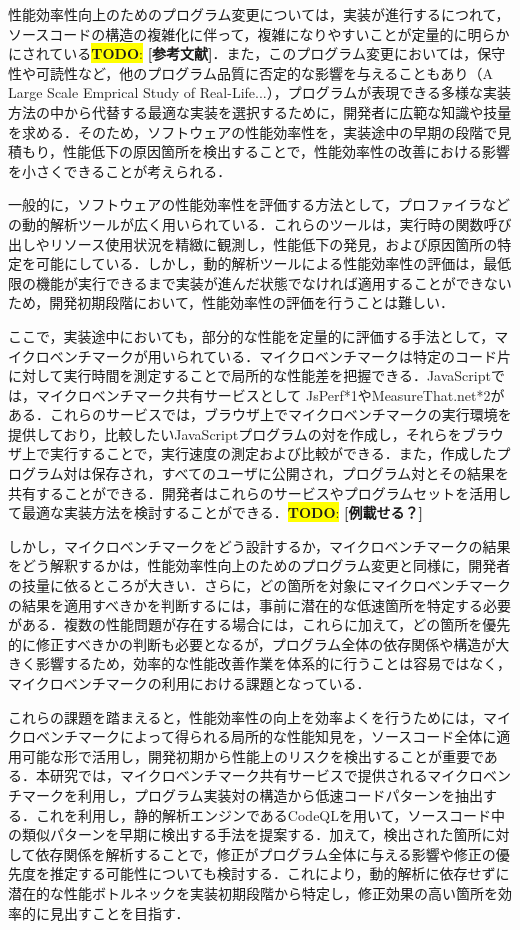 \documentclass[submit,techrep,noauthor]{ipsj}
\newcommand{\todo}[1]{\colorbox{yellow}{{\bf TODO}:}{\color{red} {\textbf{[#1]}}}}
\begin{document}
性能効率性向上のためのプログラム変更については，実装が進行するにつれて，ソースコードの構造の複雑化に伴って，複雑になりやすいことが定量的に明らかにされている\todo{参考文献}．また，このプログラム変更においては，保守性や可読性など，他のプログラム品質に否定的な影響を与えることもあり（A Large Scale Emprical Study of Real-Life...），プログラムが表現できる多様な実装方法の中から代替する最適な実装を選択するために，開発者に広範な知識や技量を求める．そのため，ソフトウェアの性能効率性を，実装途中の早期の段階で見積もり，性能低下の原因箇所を検出することで，性能効率性の改善における影響を小さくできることが考えられる． 

一般的に，ソフトウェアの性能効率性を評価する方法として，プロファイラなどの動的解析ツールが広く用いられている．これらのツールは，実行時の関数呼び出しやリソース使用状況を精緻に観測し，性能低下の発見，および原因箇所の特定を可能にしている．しかし，動的解析ツールによる性能効率性の評価は，最低限の機能が実行できるまで実装が進んだ状態でなければ適用することができないため，開発初期段階において，性能効率性の評価を行うことは難しい．

ここで，実装途中においても，部分的な性能を定量的に評価する手法として，マイクロベンチマークが用いられている．マイクロベンチマークは特定のコード片に対して実行時間を測定することで局所的な性能差を把握できる．JavaScriptでは，マイクロベンチマーク共有サービスとして JsPerf*1やMeasureThat.net*2がある．これらのサービスでは，ブラウザ上でマイクロベンチマークの実行環境を提供しており，比較したいJavaScriptプログラムの対を作成し，それらをブラウザ上で実行することで，実行速度の測定および比較ができる．また，作成したプログラム対は保存され，すべてのユーザに公開され，プログラム対とその結果を共有することができる．開発者はこれらのサービスやプログラムセットを活用して最適な実装方法を検討することができる．\todo{例載せる？}

しかし，マイクロベンチマークをどう設計するか，マイクロベンチマークの結果をどう解釈するかは，性能効率性向上のためのプログラム変更と同様に，開発者の技量に依るところが大きい．さらに，どの箇所を対象にマイクロベンチマークの結果を適用すべきかを判断するには，事前に潜在的な低速箇所を特定する必要がある．複数の性能問題が存在する場合には，これらに加えて，どの箇所を優先的に修正すべきかの判断も必要となるが，プログラム全体の依存関係や構造が大きく影響するため，効率的な性能改善作業を体系的に行うことは容易ではなく，マイクロベンチマークの利用における課題となっている．

これらの課題を踏まえると，性能効率性の向上を効率よくを行うためには，マイクロベンチマークによって得られる局所的な性能知見を，ソースコード全体に適用可能な形で活用し，開発初期から性能上のリスクを検出することが重要である．本研究では，マイクロベンチマーク共有サービスで提供されるマイクロベンチマークを利用し，プログラム実装対の構造から低速コードパターンを抽出する．これを利用し，静的解析エンジンであるCodeQLを用いて，ソースコード中の類似パターンを早期に検出する手法を提案する．加えて，検出された箇所に対して依存関係を解析することで，修正がプログラム全体に与える影響や修正の優先度を推定する可能性についても検討する．これにより，動的解析に依存せずに潜在的な性能ボトルネックを実装初期段階から特定し，修正効果の高い箇所を効率的に見出すことを目指す．
\end{document}
